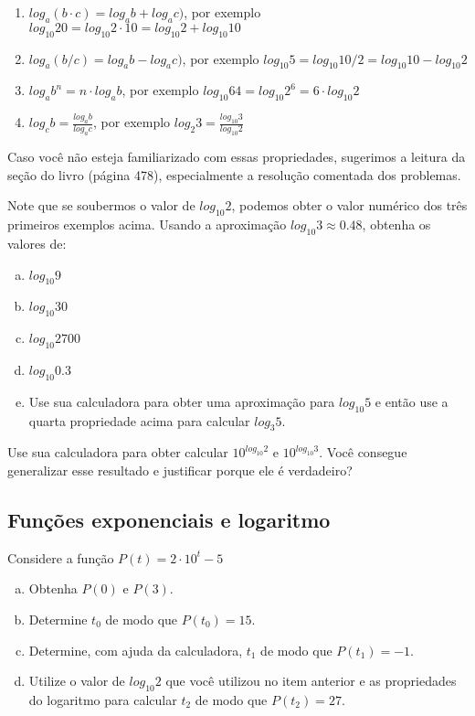 \documentclass[main_estudante.tex]{subfiles}
\begin{document}
\begin{shaded*}
\begin{enumerate}
 \item $log_a (b \cdot c) = log_a b + log_a c)$, por exemplo $log_{10} 20 = log_{10} 2 \cdot 10 = log_{10} 2 + log_{10} 10$
 \item $log_a (b/c) = log_a b - log_a c)$, por exemplo $log_{10} 5 = log_{10} 10/2 = log_{10} 10 - log_{10} 2$
 \item $log_a b^n = n \cdot log_a b$, por exemplo $log_{10} 64 = log_{10} 2^6 = 6 \cdot log_{10} 2$
 \item $log_c b = \frac{log_a b}{log_a c}$, por exemplo $log_2 3 = \frac{log_{10} 3}{log_{10} 2}$
\end{enumerate}
\end{shaded*}

Caso você não esteja familiarizado com essas propriedades, sugerimos a leitura da seção  do livro  (página 478), especialmente a resolução comentada dos problemas.

\begin{questao}
Note que se soubermos o valor de $log_{10} 2$, podemos obter o valor numérico dos três primeiros exemplos acima. Usando a aproximação $log_{10} 3 \approx 0.48$, obtenha os valores de:
\begin{enumerate}[a)]
\item $log_{10} 9$
\item $log_{10} 30$
\item $log_{10} 2700$
\item $log_{10} 0.3$
\item Use sua calculadora para obter uma aproximação para $log_{10} 5$ e então use a quarta propriedade acima para calcular $log_{3} 5$.
\end{enumerate}
\end{questao}

\begin{reflita}
 Use sua calculadora para obter calcular $10^{log_{10} 2}$ e $10^{log_{10} 3}$. Você consegue generalizar esse resultado e justificar porque ele é verdadeiro?
\end{reflita}


\subsection*{Funções exponenciais e logaritmo}

\begin{questao}
Considere a função $P(t)=2 \cdot 10^t - 5$
\begin{enumerate}[a)]
\item Obtenha $P(0)$ e $P(3)$.
\item Determine $t_0$ de modo que $P(t_0)=15$.
\item Determine, com ajuda da calculadora, $t_1$ de modo que $P(t_1)=-1$.
\item Utilize o valor de $log_{10} 2$ que você utilizou no item anterior e as propriedades do logaritmo para calcular $t_2$ de modo que $P(t_2)=27$.
\end{enumerate}
\end{questao}
\end{document}
